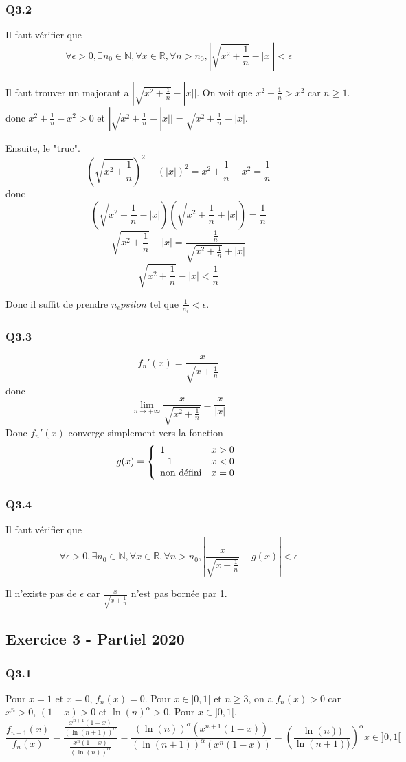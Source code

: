 \documentclass[]{book}
\theoremstyle{definition}
\newcommand{\bb}[1]{\mathbb{#1}}
\newcommand{\R}{\bb{R}}
\newcommand{\N}{\bb{N}}
\begin{document}
\subsubsection*{Q3.2}
Il faut v\'erifier que
$$\forall \epsilon > 0, \exists n_0 \in \N, \forall x \in \R, \forall n > n_0, \left|\sqrt{x^2+\frac{1}{n}} - |x|\right| < \epsilon$$

Il faut trouver un majorant a $|\sqrt{x^2+\frac{1}{n}} - |x||$. On voit que $x^2 + \frac{1}{n} > x^2$ car $n \geq 1$. donc $x^2 + \frac{1}{n} - x^2 > 0$ et $|\sqrt{x^2+\frac{1}{n}} - |x|| = \sqrt{x^2+\frac{1}{n}} - |x|$.

Ensuite, le "truc".
$$\left(\sqrt{x^2+\frac{1}{n}}\right)^2 - (|x|)^2 = x^2+\frac{1}{n} - x^2 = \frac{1}{n}$$
donc
$$\left(\sqrt{x^2+\frac{1}{n}} - |x|\right)\left(\sqrt{x^2+\frac{1}{n}} + |x|\right) = \frac{1}{n}$$
$$\sqrt{x^2+\frac{1}{n}} - |x| = \frac{\frac{1}{n}}{\sqrt{x^2+\frac{1}{n}} + |x|}$$
$$\sqrt{x^2+\frac{1}{n}} - |x| < \frac{1}{n}$$

Donc il suffit de prendre $n_epsilon$ tel que $\frac{1}{n_{\epsilon}} < \epsilon$.

\subsubsection*{Q3.3}
$$f_n'(x) = \frac{x}{\sqrt{x+\frac{1}{n}}}$$
donc
$$\lim_{n \to +\infty} \frac{x}{\sqrt{x^2+\frac{1}{n}}} = \frac{x}{|x|}$$
Donc $f_n'(x)$ converge simplement vers la fonction 
$$g(x) = 
\left\{
\begin{array}{l l}
1 & x > 0\\
-1 & x < 0\\
\text{non d\'efini} & x = 0\\
\end{array}
\right.
$$

\subsubsection*{Q3.4}
Il faut v\'erifier que
$$\forall \epsilon > 0, \exists n_0 \in \N, \forall x \in \R, \forall n > n_0, \left|\frac{x}{\sqrt{x+\frac{1}{n}}} - g(x)\right| < \epsilon$$

Il n'existe pas de $\epsilon$ car $\frac{x}{\sqrt{x+\frac{1}{n}}}$ n'est pas born\'ee par 1.


\subsection*{Exercice 3 - Partiel 2020}
\subsubsection*{Q3.1}
Pour $x=1$ et $x=0$, $f_n(x)=0$.
Pour $x \in ]0,1[$ et $n \geq 3$, on a $f_n(x) > 0$ car $x^n >0$, $(1-x) >0$ et $\ln(n)^{\alpha} > 0$. 
Pour $x \in ]0,1[$,
$$\frac{f_{n+1}(x)}{f_n(x)} = \frac{\frac{x^{n+1}(1-x)}{(\ln(n+1))^{\alpha}}}{\frac{x^n(1-x)}{(\ln(n))^{\alpha}}} = \frac{(\ln(n))^{\alpha}(x^{n+1}(1-x))} {(\ln(n+1))^{\alpha}(x^n(1-x))} = \left(\frac{\ln(n))}{\ln(n+1))} \right)^{\alpha}x \in ]0,1[$$
\end{document}

